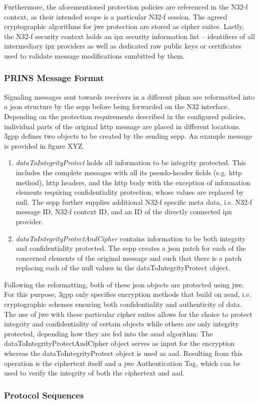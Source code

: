 Furthermore, the aforementioned protection policies are referenced in the N32-f context, as their intended scope is a particular N32-f session.
The agreed cryptographic algorithms for \gls{jwe} protection are stored as cipher suites.
Lastly, the N32-f security context holds an \gls{ipx} security information list -- identifiers of all intermediary \gls{ipx} providers as well as dedicated raw public keys or certificates used to validate message modifications sumbitted by them.

\subsubsection{PRINS Message Format}

Signaling messages sent towards receivers in a different \gls{plmn} are reformatted into a \gls{json} structure by the \gls{sepp} before being forwarded on the N32 interface.
Depending on the protection requirements described in the configured policies, individual parts of the original \gls{http} message are placed in different locations.
\gls{3gpp} defines two objects to be created by the sending \gls{sepp}.
An example message is provided in figure XYZ.

\begin{enumerate}[label=--]
    \item \textit{dataToIntegrityProtect} holds all information to be integrity protected.
    This includes the complete messages with all its pseudo-header fields (e.g. \gls{http} method), \gls{http} headers, and the \gls{http} body with the exception of information elements requiring confidentiality protection, whose values are replaced by null.
    The \gls{sepp} further supplies additional N32-f specific meta data, i.e. N32-f message ID, N32-f context ID, and an ID of the directly connected \gls{ipx} provider.

    \item \textit{dataToIntegrityProtectAndCipher} contains information to be both integrity and confidentiality protected.
    The \gls{sepp} creates a \gls{json} patch for each of the concerned elements of the original message and such that there is a patch replacing each of the null values in the dataToIntegrityProtect object.
\end{enumerate}

Following the reformatting, both of these \gls{json} objects are protected using \gls{jwe}.
For this purpose, \gls{3gpp} only specifies encryption methods that build on \gls{aead}, i.e. cryptographic schemes ensuring both confidentiality and authenticity of data.
The use of \gls{jwe} with these particular cipher suites allows for the choice to protect integrity and confidentiality of certain objects while others are only integrity protected, depending how they are fed into the \gls{aead} algorithm:
The dataToIntegrityProtectAndCipher object serves as input for the encryption whereas the dataToIntegrityProtect object is used as \gls{aad}.
Resulting from this operation is the ciphertext itself and a \gls{jwe} Authentication Tag, which can be used to verify the integrity of both the ciphertext and \gls{aad}.

\subsubsection{Protocol Sequences}
